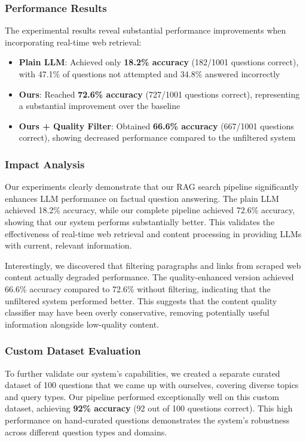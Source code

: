 \documentclass[fleqn,moreauthors,10pt]{ds_report}
\begin{document}
\subsubsection*{Performance Results}
The experimental results reveal substantial performance improvements when incorporating real-time web retrieval:

\begin{itemize}[noitemsep]
    \item \textbf{Plain LLM}: Achieved only \textbf{18.2\% accuracy} (182/1001 questions correct), with 47.1\% of questions not attempted and 34.8\% answered incorrectly
    \item \textbf{Ours}: Reached \textbf{72.6\% accuracy} (727/1001 questions correct), representing a substantial improvement over the baseline
    \item \textbf{Ours + Quality Filter}: Obtained \textbf{66.6\% accuracy} (667/1001 questions correct), showing decreased performance compared to the unfiltered system
\end{itemize}

\subsubsection*{Impact Analysis}
Our experiments clearly demonstrate that our RAG search pipeline significantly enhances LLM performance on factual question answering. The plain LLM achieved 18.2\% accuracy, while our complete pipeline achieved 72.6\% accuracy, showing that our system performs substantially better. This validates the effectiveness of real-time web retrieval and content processing in providing LLMs with current, relevant information.

Interestingly, we discovered that filtering paragraphs and links from scraped web content actually degraded performance. The quality-enhanced version achieved 66.6\% accuracy compared to 72.6\% without filtering, indicating that the unfiltered system performed better. This suggests that the content quality classifier may have been overly conservative, removing potentially useful information alongside low-quality content.

\subsubsection*{Custom Dataset Evaluation}
To further validate our system's capabilities, we created a separate curated dataset of 100 questions that we came up with ourselves, covering diverse topics and query types. Our pipeline performed exceptionally well on this custom dataset, achieving \textbf{92\% accuracy} (92 out of 100 questions correct). This high performance on hand-curated questions demonstrates the system's robustness across different question types and domains.
\end{document}
